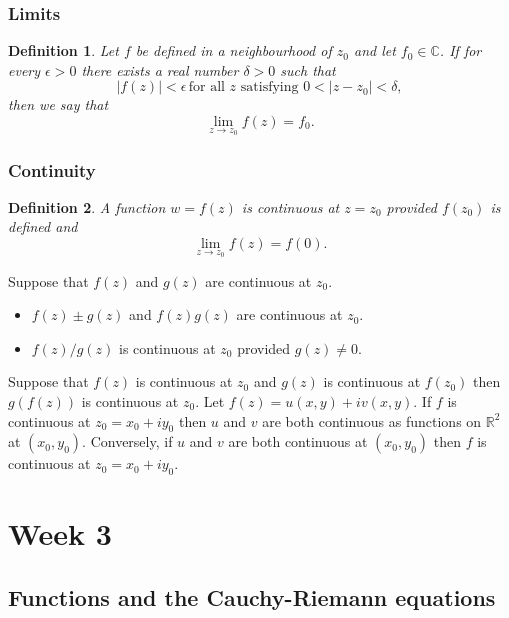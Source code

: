 \documentclass{article}
\newtheorem{definition}{Definition}
\begin{document}
\subsubsection{Limits}
\begin{definition}
    Let $f$ be defined in a neighbourhood of $z_0$ and let $f_0\in\mathbb{C}$. If for every $\epsilon>0$ there exists a real number $\delta>0$ such that
    \begin{equation}
        \vert f(z)\vert <\epsilon\,\text{for all }z\text{ satisfying }0<\vert z-z_0\vert<\delta, \nonumber
    \end{equation}
    then we say that
    \begin{equation}
        \lim_{z\to z_0}f(z)=f_0.
    \end{equation}
\end{definition}

\subsubsection{Continuity}
\begin{definition}
    A function $w=f(z)$ is continuous at $z=z_0$ provided $f(z_0)$ is defined and
    \begin{equation}
        \lim_{z\to z_0}f(z)=f(0).
    \end{equation}
\end{definition}
Suppose that $f(z)$ and $g(z)$ are continuous at $z_0$.
\begin{itemize}
    \item $f(z)\pm g(z)$ and $f(z)g(z)$ are continuous at $z_0$.
    \item $f(z)/g(z)$ is continuous at $z_0$ provided $g(z)\neq 0$.
\end{itemize}
Suppose that $f(z)$ is continuous at $z_0$ and $g(z)$ is continuous at $f(z_0)$ then $g(f(z))$ is continuous at $z_0$.
\linebreak
Let $f(z)=u(x,y)+iv(x,y).$ If $f$ is continuous at $z_0=x_0+i y_0$ then $u$ and $v$ are both continuous as functions on $\mathbb{R}^2$ at $(x_0,y_0)$. Conversely, if $u$ and $v$ are both continuous at $(x_0,y_0)$ then $f$ is continuous at $z_0=x_0+i y_0$.

\section{Week 3}
\subsection{Functions and the Cauchy-Riemann equations}
\end{document}
